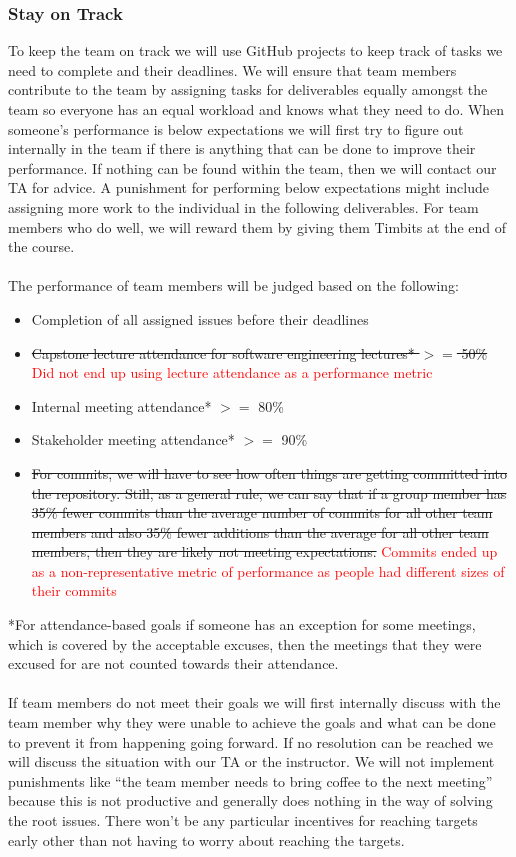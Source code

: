 \documentclass{article}
\begin{document}
\subsubsection*{Stay on Track}

To keep the team on track we will use GitHub projects to keep track
of tasks we need to complete and their
deadlines. We will ensure that team members contribute to the team by
assigning tasks for deliverables
equally amongst the team so everyone has an equal workload and knows
what they need to do. When
someone’s performance is below expectations we will first try to
figure out internally in the team if there is
anything that can be done to improve their performance. If nothing
can be found within the team, then we
will contact our TA for advice. A punishment for performing below
expectations might include assigning more
work to the individual in the following deliverables. For team
members who do well, we will reward them by
giving them Timbits at the end of the course.\\
\\
The performance of team members will be judged based on the following:
\begin{itemize}
  \item Completion of all assigned issues before their deadlines
  \item \sout{Capstone lecture attendance for software engineering
    lectures* $>=$ 50\%} \textcolor{red}{Did not end up using lecture
    attendance as a performance metric}
  \item Internal meeting attendance* $>=$ 80\%
  \item Stakeholder meeting attendance* $>=$ 90\%
  \item \sout{For commits, we will have to see how often things are
      getting committed into the repository. Still, as a
      general rule, we can say that if a group member has 35\% fewer
      commits than the average number of
      commits for all other team members and also 35\% fewer
      additions than the average for all other team
    members, then they are likely not meeting expectations.}
    \textcolor{red}{Commits ended up as a non-representative metric
    of performance as people had different sizes of their commits}
\end{itemize}
*For attendance-based goals if someone has an exception for some
meetings, which is covered by the
acceptable excuses, then the meetings that they were excused for are
not counted towards their attendance.\\
\\
If team members do not meet their goals we will first internally
discuss with the team member why they were
unable to achieve the goals and what can be done to prevent it from
happening going forward. If no
resolution can be reached we will discuss the situation with our TA
or the instructor. We will not implement
punishments like “the team member needs to bring coffee to the next
meeting” because this is not productive
and generally does nothing in the way of solving the root issues.
There won’t be any particular incentives for
reaching targets early other than not having to worry about reaching
the targets.
\end{document}
